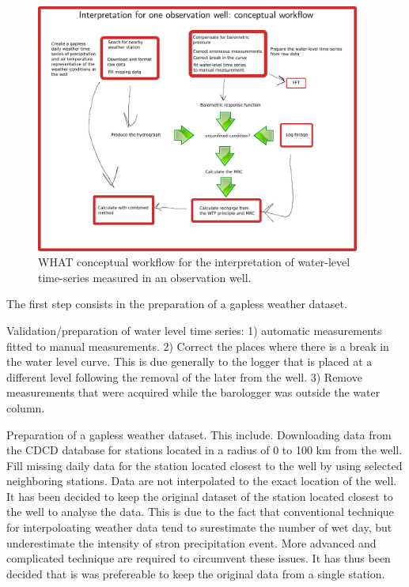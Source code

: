 \documentclass[WHATMANUAL.tex]{subfiles}
\begin{document}
\begin{figure}[!ht]
\centering
\includegraphics[width=0.95\textwidth]{img/WHAT_Workflow}
\caption[WHAT conceptual workflow.]{WHAT conceptual workflow for the interpretation of water-level time-series measured in an observation well.}
\label{fig:WHAT_workflow}
\end{figure}

The first step consists in the preparation of a gapless weather dataset.

Validation/preparation of water level time series: 1) automatic measurements fitted to manual measurements. 2) Correct the places where there is a break in the water level curve. This is due generally to the logger that is placed at a different level following the removal of the later from the well. 3) Remove measurements that were acquired while the barologger was outside the water column.

Preparation of a gapless weather dataset. This include. Downloading data from the CDCD database for stations located in a radius of 0 to 100 km from the well. Fill missing daily data for the station located closest to the well by using selected neighboring stations. Data are not interpolated to the exact location of the well. It has been decided to keep the original dataset of the station located closest to the well to analyse the data. This is due to the fact that conventional technique for interpoloating weather data tend to surestimate the number of wet day, but underestimate the intensity of stron precipitation event. More advanced and complicated technique are required to circumvent these issues. It has thus been decided that is was prefereable to keep the original data from a single station.
\end{document}
